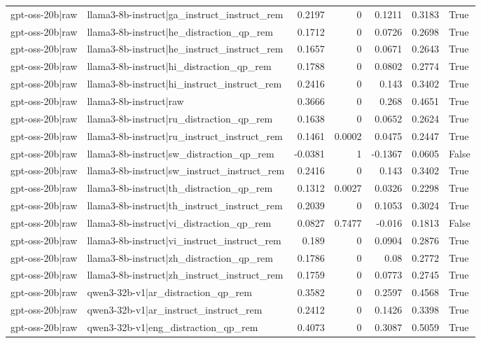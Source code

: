 \begin{table}
\begin{tabular}{l l r r r r l}
gpt-oss-20b|raw & llama3-8b-instruct|ga_instruct_instruct_rem & 0.2197 & 0 & 0.1211 & 0.3183 & True \\
gpt-oss-20b|raw & llama3-8b-instruct|he_distraction_qp_rem & 0.1712 & 0 & 0.0726 & 0.2698 & True \\
gpt-oss-20b|raw & llama3-8b-instruct|he_instruct_instruct_rem & 0.1657 & 0 & 0.0671 & 0.2643 & True \\
gpt-oss-20b|raw & llama3-8b-instruct|hi_distraction_qp_rem & 0.1788 & 0 & 0.0802 & 0.2774 & True \\
gpt-oss-20b|raw & llama3-8b-instruct|hi_instruct_instruct_rem & 0.2416 & 0 & 0.143 & 0.3402 & True \\
gpt-oss-20b|raw & llama3-8b-instruct|raw & 0.3666 & 0 & 0.268 & 0.4651 & True \\
gpt-oss-20b|raw & llama3-8b-instruct|ru_distraction_qp_rem & 0.1638 & 0 & 0.0652 & 0.2624 & True \\
gpt-oss-20b|raw & llama3-8b-instruct|ru_instruct_instruct_rem & 0.1461 & 0.0002 & 0.0475 & 0.2447 & True \\
gpt-oss-20b|raw & llama3-8b-instruct|sw_distraction_qp_rem & -0.0381 & 1 & -0.1367 & 0.0605 & False \\
gpt-oss-20b|raw & llama3-8b-instruct|sw_instruct_instruct_rem & 0.2416 & 0 & 0.143 & 0.3402 & True \\
gpt-oss-20b|raw & llama3-8b-instruct|th_distraction_qp_rem & 0.1312 & 0.0027 & 0.0326 & 0.2298 & True \\
gpt-oss-20b|raw & llama3-8b-instruct|th_instruct_instruct_rem & 0.2039 & 0 & 0.1053 & 0.3024 & True \\
gpt-oss-20b|raw & llama3-8b-instruct|vi_distraction_qp_rem & 0.0827 & 0.7477 & -0.016 & 0.1813 & False \\
gpt-oss-20b|raw & llama3-8b-instruct|vi_instruct_instruct_rem & 0.189 & 0 & 0.0904 & 0.2876 & True \\
gpt-oss-20b|raw & llama3-8b-instruct|zh_distraction_qp_rem & 0.1786 & 0 & 0.08 & 0.2772 & True \\
gpt-oss-20b|raw & llama3-8b-instruct|zh_instruct_instruct_rem & 0.1759 & 0 & 0.0773 & 0.2745 & True \\
gpt-oss-20b|raw & qwen3-32b-v1|ar_distraction_qp_rem & 0.3582 & 0 & 0.2597 & 0.4568 & True \\
gpt-oss-20b|raw & qwen3-32b-v1|ar_instruct_instruct_rem & 0.2412 & 0 & 0.1426 & 0.3398 & True \\
gpt-oss-20b|raw & qwen3-32b-v1|eng_distraction_qp_rem & 0.4073 & 0 & 0.3087 & 0.5059 & True \\

\end{tabular}
\end{table}
